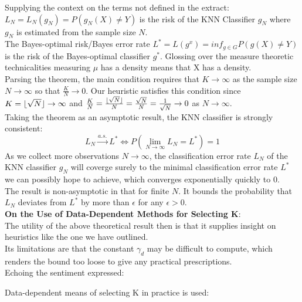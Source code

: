 \documentclass{book}
\DeclarePairedDelimiter\floor{\lfloor}{\rfloor}
\begin{document}
\vspace{1mm}
Supplying the context on the terms not defined in the extract: \(L_N = L_N(g_N) = P(g_N(X) \neq Y)\) is the risk of the KNN Classifier \(g_N\) where \(g_N\) is estimated from the sample size \(N\).\\
The Bayes-optimal risk/Bayes error rate \(L^* = L(g^x) = inf_{g\in G} P(g(X) \neq Y)\) is the risk of the Bayes-optimal classifier \(g^*\). Glossing over the measure theoretic technicalities measuring \(\mu\) has a density means that X has a density.\\
Parsing the theorem, the main condition requires that \(K \rightarrow \infty\) as the sample size \(N \rightarrow \infty\) so that \(\frac{K}{N} \rightarrow 0\). Our heuristic satisfies this condition since \(K = \floor{\sqrt{N}} \rightarrow \infty \) and \(\frac{K}{N} = \frac{\floor{\sqrt{N}}}{N} = \frac{\sqrt{N}}{N} = \frac{1}{\sqrt{N}} \rightarrow 0\) as \(N \rightarrow \infty\).\\
\vspace{1mm}
Taking the theorem as an asymptotic result, the KNN classifier is strongly consistent:
\[
    L_N \xrightarrow{a.s.} L^* \Longleftrightarrow P\left(\lim_{N \rightarrow \infty} L_N = L^*\right) = 1
\]
As we collect more observations \(N \rightarrow \infty\), the classification error rate \(L_N\) of the KNN classifier \(g_N\) will coverge surely to the minimal classification error rate \(L^*\) we can possibly hope to achieve, which converges exponentially quickly to 0.\\
The result is non-asymptotic in that for finite \(N\). It bounds the probability that \(L_N\) deviates from \(L^*\) by more than \(\epsilon\) for any \(\epsilon > 0\).\\
\textbf{On the Use of Data-Dependent Methods for Selecting K}:\\
The utility of the above theoretical result then is that it supplies insight on heuristics like the one we have outlined.\\
Its limitations are that the constant \(\gamma_d\) may be difficult to compute, which renders the bound too loose to give any practical prescriptions.\\
Echoing the sentiment expressed:

\vspace{1mm}
Data-dependent means of selecting K in practice is used:
\end{document}
